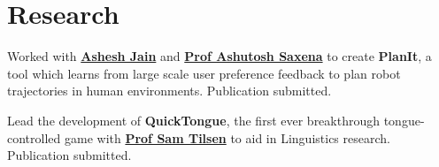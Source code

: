 \documentclass[a4paper]{deedy-resume} %
\begin{document}
\begin{minipage}[t]{0.66\textwidth}
\sectionspace


\section{Research}


Worked with \textbf{\href{http://www.cs.cornell.edu/~ashesh/}{Ashesh Jain}} and \textbf{\href{http://www.cs.cornell.edu/~asaxena/}{Prof Ashutosh Saxena}} to create \textbf{PlanIt}, a tool which learns from large scale user preference feedback to plan robot trajectories in human environments. Publication submitted.

\sectionspace %



Lead the development of \textbf{QuickTongue}, the first ever breakthrough tongue-controlled game with \textbf{\href{http://conf.ling.cornell.edu/~tilsen/}{Prof Sam Tilsen}} to aid in Linguistics research. Publication submitted.

\sectionspace


\end{minipage}








\end{document}
